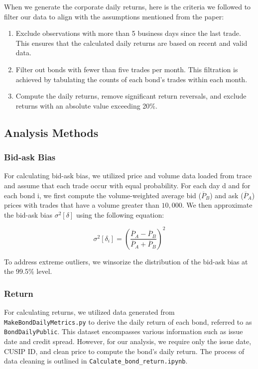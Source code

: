 \documentclass[12pt]{article}
\begin{document}
When we generate the corporate daily returns, here is the criteria we followed to filter our data to align with the assumptions mentioned from the paper:

\begin{enumerate}
    \item Exclude observations with more than 5 business days since the last trade. This ensures that the calculated daily returns are based on recent and valid data.
    \item Filter out bonds with fewer than five trades per month. This filtration is achieved by tabulating the counts of each bond's trades within each month.
    \item Compute the daily returns, remove significant return reversals, and exclude returns with an absolute value exceeding 20\%.
\end{enumerate}




\subsection{Analysis Methods}
\subsubsection{Bid-ask Bias}
For calculating bid-ask bias, we utilized price and volume data loaded from trace and assume that each trade occur with equal probability. For each day d and for each bond i, we first compute the volume-weighted average bid ($\overline{P}_B$) and ask ($\overline{P}_A$) prices with trades that have a volume greater than $10,000$. We then approximate the bid-ask bias $\sigma^2[\delta]$ using the following equation:

\begin{equation}
\sigma^2[\delta_i] = \left( \frac{\overline{P}_A - \overline{P}_B}{\overline{P}_A + \overline{P}_B} \right)^2
\end{equation}

To address extreme outliers, we winsorize the distribution of the bid-ask bias at the 99.5\% level.

\subsubsection{Return}
For calculating returns, we utilized data generated from \texttt{MakeBondDailyMetrics.py} to derive the daily return of each bond, referred to as \texttt{BondDailyPublic}. This dataset encompasses various information such as issue date and credit spread. However, for our analysis, we require only the issue date, CUSIP ID, and clean price to compute the bond's daily return. The process of data cleaning is outlined in \texttt{Calculate\_bond\_return.ipynb}.
\end{document}
